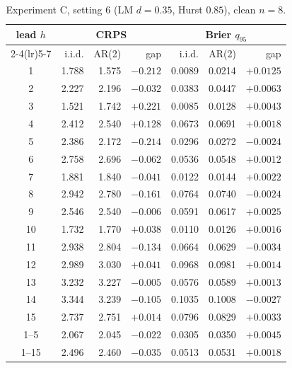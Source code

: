 \documentclass[11pt]{article}
\begin{document}
\begin{table}[ht]
\centering
\caption{Experiment C, setting 6 (LM $d = 0.35$, Hurst $0.85$), clean
$n = 8$.}
\label{tab:expC6}
\small
\begin{tabular}{crrrrrr}
\toprule
lead $h$ & \multicolumn{3}{c}{CRPS} & \multicolumn{3}{c}{Brier $q_{95}$} \\
\cmidrule(lr){2-4}\cmidrule(lr){5-7}
 & i.i.d. & AR(2) & gap & i.i.d. & AR(2) & gap \\
\midrule
1 & 1.788 & 1.575 & $-0.212$ & 0.0089 & 0.0214 & $+0.0125$ \\
2 & 2.227 & 2.196 & $-0.032$ & 0.0383 & 0.0447 & $+0.0063$ \\
3 & 1.521 & 1.742 & $+0.221$ & 0.0085 & 0.0128 & $+0.0043$ \\
4 & 2.412 & 2.540 & $+0.128$ & 0.0673 & 0.0691 & $+0.0018$ \\
5 & 2.386 & 2.172 & $-0.214$ & 0.0296 & 0.0272 & $-0.0024$ \\
6 & 2.758 & 2.696 & $-0.062$ & 0.0536 & 0.0548 & $+0.0012$ \\
7 & 1.881 & 1.840 & $-0.041$ & 0.0122 & 0.0144 & $+0.0022$ \\
8 & 2.942 & 2.780 & $-0.161$ & 0.0764 & 0.0740 & $-0.0024$ \\
9 & 2.546 & 2.540 & $-0.006$ & 0.0591 & 0.0617 & $+0.0025$ \\
10 & 1.732 & 1.770 & $+0.038$ & 0.0110 & 0.0126 & $+0.0016$ \\
11 & 2.938 & 2.804 & $-0.134$ & 0.0664 & 0.0629 & $-0.0034$ \\
12 & 2.989 & 3.030 & $+0.041$ & 0.0968 & 0.0981 & $+0.0014$ \\
13 & 3.232 & 3.227 & $-0.005$ & 0.0576 & 0.0589 & $+0.0013$ \\
14 & 3.344 & 3.239 & $-0.105$ & 0.1035 & 0.1008 & $-0.0027$ \\
15 & 2.737 & 2.751 & $+0.014$ & 0.0796 & 0.0829 & $+0.0033$ \\
\midrule
1--5 & 2.067 & 2.045 & $-0.022$ & 0.0305 & 0.0350 & $+0.0045$ \\
1--15 & 2.496 & 2.460 & $-0.035$ & 0.0513 & 0.0531 & $+0.0018$ \\
\bottomrule
\end{tabular}
\end{table}
\end{document}
